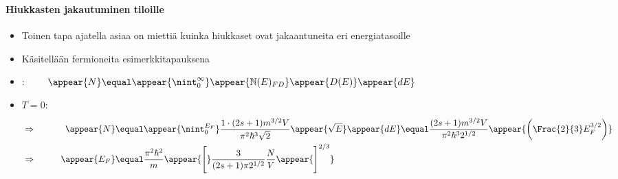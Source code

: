 \begin{frame}
\frametitle{\texorpdfstring{\culine[\sectiontitleulinecolor]{\sectiontitle}}{\sectiontitle} }
\framesubtitle{Hiukkasten jakautuminen tiloille}
\begin{itemize}
	\item Toinen tapa ajatella asiaa on miettiä kuinka hiukkaset ovat jakaantuneita eri energiatasoille 
	\item Käsitellään fermioneita esimerkkitapauksena  

\item {}: $\qquad \appear{N} \equal \appear{\nint_{0}^{\infty}}  \appear{\mathbb{N} (E)_{F D}} \appear{D(E)} \appear{d E}$

\item $T=0:$   \vspace{-4mm}
\[ 
\begin{aligned} 
&\Rightarrow& \qquad \appear{N}  &\equal  \appear{\nint_{0}^{E_{F}}} \frac{1\cdot (2 s+1) m^{3 / 2} V}{\pi^{2} \hbar^{3} \sqrt{2}} \appear{\sqrt{E}} \appear{d E}  \equal  \frac{(2 s+1) m^{3 / 2} V}{\pi^{2} \hbar^{3} 2^{1/2}} \appear{ \bigg( \Frac{2}{3} E_{F}^{3 / 2} \bigg) } \\ 
&\Rightarrow& \qquad \appear{E_{F}}  &\equal \frac{\pi^{2} \hbar^{2}}{m} \appear{\Bigg[}\frac{3}{(2 s+1) \pi 2^{1/2}} \frac{N}{V} \appear{\Bigg]^{2 / 3}}
\end{aligned} 
\]
\end{itemize}

\endofslide 
\end{frame}

